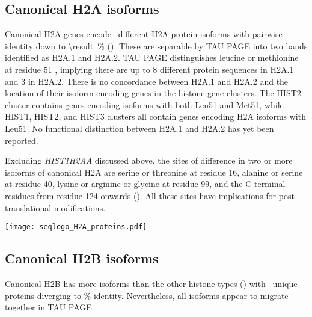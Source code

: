   \subsection{Canonical H2A isoforms}
    Canonical H2A genes encode \HTwoAUniqueProteins{}~different H2A
    protein isoforms with pairwise identity down to
     \SI{\result}{\percent} ().
    These are separable by TAU PAGE into two bands identified as H2A.1 and H2A.2.
    TAU PAGE distinguishes leucine or methionine at residue 51 \citep{FranklinZweidler1977,Zweidler1977},
    implying there are up to 8 different protein sequences in H2A.1 and 3 in H2A.2.
    There is no concordance between H2A.1 and H2A.2
    and the location of their isoform-encoding genes in the histone gene clusters.
    The HIST2 cluster contains genes encoding isoforms with both Leu51 and Met51,
    while HIST1, HIST2, and HIST3 clusters all contain genes encoding H2A isoforms with Leu51.
    No functional distinction between H2A.1 and H2A.2 has yet been reported.

    Excluding \textit{HIST1H2AA} discussed above,
    the sites of difference in two or more isoforms of canonical H2A are
    serine or threonine at residue 16,
    alanine or serine at residue 40,
    lysine or arginine or glycine at residue 99,
    and the C-terminal residues from residue 124 onwards ().
    All these sites have implications for post-translational modifications.

    \begin{table}
      \caption{%
        Canonical H2A encoded protein isoforms.
        Upper panel shows isoform variations relative to most common isoform
        using HGVS recommended nomenclature \citep{mutnomenclature2003}.
        Lower panel shows sequence logo of all isoforms aligned 
        with invariant residues in grey.
      }
      \label{tab:H2A-consensus}
      
      \texttt{[image: seqlogo\_H2A\_proteins.pdf]}
    \end{table}

  \subsection{Canonical H2B isoforms}
    Canonical H2B has more isoforms than the other histone types ()
    with \HTwoBUniqueProteins{}~unique proteins
    diverging to \result\% identity.
    Nevertheless, all isoforms appear to migrate together in TAU PAGE.

